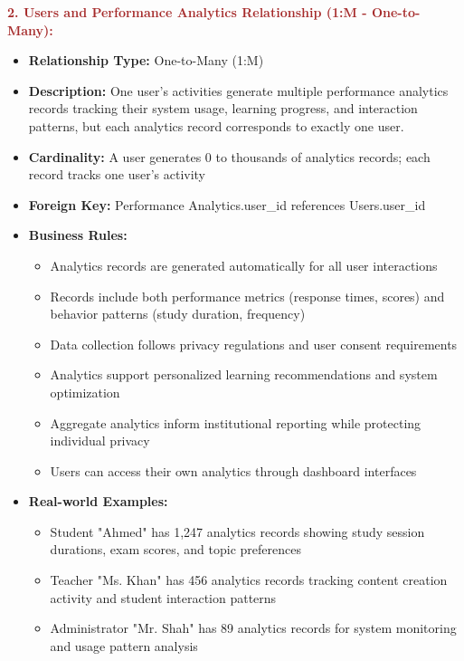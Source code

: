 \documentclass[12pt,a4paper,oneside]{book}
\begin{document}
\textbf{\textcolor{brown}{2. Users and Performance Analytics Relationship (1:M - One-to-Many):}}
\begin{itemize}
    \item \textbf{Relationship Type:} One-to-Many (1:M)
    \item \textbf{Description:} One user's activities generate multiple performance analytics records tracking their system usage, learning progress, and interaction patterns, but each analytics record corresponds to exactly one user.
    \item \textbf{Cardinality:} A user generates 0 to thousands of analytics records; each record tracks one user's activity
    \item \textbf{Foreign Key:} Performance Analytics.user\_id references Users.user\_id
    \item \textbf{Business Rules:}
        \begin{itemize}
            \item Analytics records are generated automatically for all user interactions
            \item Records include both performance metrics (response times, scores) and behavior patterns (study duration, frequency)
            \item Data collection follows privacy regulations and user consent requirements
            \item Analytics support personalized learning recommendations and system optimization
            \item Aggregate analytics inform institutional reporting while protecting individual privacy
            \item Users can access their own analytics through dashboard interfaces
        \end{itemize}
    \item \textbf{Real-world Examples:}
        \begin{itemize}
            \item Student "Ahmed" has 1,247 analytics records showing study session durations, exam scores, and topic preferences
            \item Teacher "Ms. Khan" has 456 analytics records tracking content creation activity and student interaction patterns
            \item Administrator "Mr. Shah" has 89 analytics records for system monitoring and usage pattern analysis
        \end{itemize}
\end{itemize}
\end{document}

